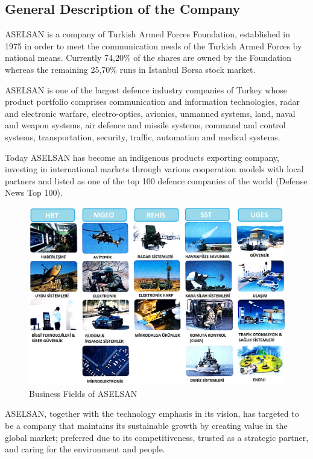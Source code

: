 
\subsection{General Description of the Company}
\-
\indent ASELSAN is a company of Turkish Armed Forces Foundation, established in 1975 in order to meet the communication needs of the Turkish Armed Forces by national means. Currently 74,20\% of the shares are owned by the Foundation whereas the remaining 25,70\% runs in İstanbul Borsa stock market.

	ASELSAN is one of the largest defence industry companies of Turkey whose product portfolio comprises communication and information technologies, radar and electronic warfare, electro-optics, avionics, unmanned systems, land, naval and weapon systems, air defence and missile systems, command and control systems, transportation, security, traffic, automation and medical systems. 
	
	Today ASELSAN has become an indigenous products exporting company, investing in international markets through various cooperation models with local partners and listed as one of the top 100 defence companies of the world (Defense News Top 100).

\begin{figure}[H]
\center
\setlength{\unitlength}{\textwidth} 
\includegraphics[width=0.72\unitlength]{Aselsan1_2}
\caption{\label{fig:As12}Business Fields of ASELSAN }
\end{figure}

	ASELSAN, together with the technology emphasis in its vision, has targeted to be a company that maintains its sustainable growth by creating value in the global market; preferred due to its competitiveness, trusted as a strategic partner, and caring for the environment and people.

